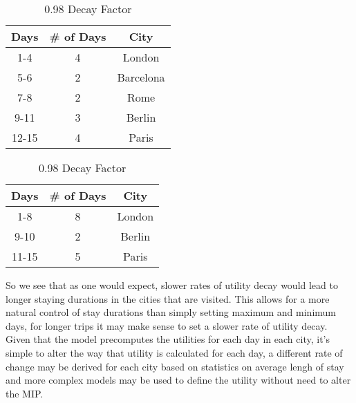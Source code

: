 \documentclass[12pt]{article}
\begin{document}
\begin{table}[h!]
\caption{Trip plan with a decay factor for 0.95 and 0.98 for 15 days}
	\begin{minipage}[b]{0.45\linewidth}
		\caption{0.95 Decay Factor}
		\centering
		\vspace{1mm}
		\begin{tabular}{c|c|c}
			\hline
			\rule{0pt}{2ex} Days & \# of Days & City \\
			\hline
			1-4 & 4 & London \\
			5-6 & 2 & Barcelona \\
			7-8 & 2 & Rome \\
			9-11 & 3 & Berlin \\
			12-15 & 4 & Paris \\
			\hline
		\end{tabular}
	\end{minipage}
	\hspace{0.5cm}
	\begin{minipage}[b]{0.45\linewidth}
		\caption{0.98 Decay Factor}
		\centering
		\vspace{1mm}
		\begin{tabular}{c|c|c}
			\hline
			\rule{0pt}{2ex} Days & \# of Days & City \\
			\hline
			1-8 & 8 & London \\
			9-10 & 2 & Berlin \\
			11-15 & 5 & Paris \\
			\hline
		\end{tabular}
	\end{minipage}
\end{table}

So we see that as one would expect, slower rates of utility decay would lead to longer staying durations in the cities that are visited. This allows for a more natural control of stay durations than simply setting maximum and minimum days, for longer trips it may make sense to set a slower rate of utility decay. Given that the model precomputes the utilities for each day in each city, it's simple to alter the way that utility is calculated for each day, a different rate of change may be derived for each city based on statistics on average lengh of stay and more complex models may be used to define the utility without need to alter the MIP.
\end{document}

